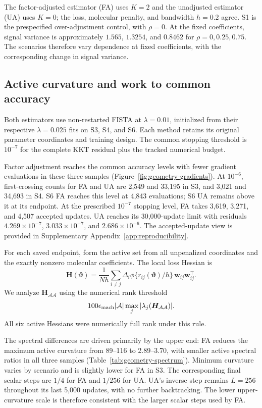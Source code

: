 

The factor-adjusted estimator (FA) uses $K=2$ and the unadjusted estimator (UA) uses $K=0$; the loss, molecular penalty, and bandwidth $h=0.2$ agree. S1 is the prespecified over-adjustment control, with $\rho=0$. At the fixed coefficients, signal variance is approximately $1.565$, $1.3254$, and $0.8462$ for $\rho=0,0.25,0.75$. The scenarios therefore vary dependence at fixed coefficients, with the corresponding change in signal variance.

\subsection{Active curvature and work to common accuracy}
\label{subsec:geometry-results}
Both estimators use non-restarted FISTA at $\lambda=0.01$, initialized from their respective $\lambda=0.025$ fits on S3, S4, and S6. Each method retains its original parameter coordinates and training design. The common stopping threshold is $10^{-7}$ for the complete KKT residual plus the tracked numerical budget.

Factor adjustment reaches the common accuracy levels with fewer gradient evaluations in these three samples (Figure~\ref{fig:geometry-gradients}). At $10^{-6}$, first-crossing counts for FA and UA are 2,549 and 33,195 in S3, and 3,021 and 34,693 in S4. S6 FA reaches this level at 4,843 evaluations; S6 UA remains above it at its endpoint. At the prescribed $10^{-7}$ stopping level, FA takes 3,619, 3,271, and 4,507 accepted updates. UA reaches its 30,000-update limit with residuals $4.269\times10^{-7}$, $3.033\times10^{-7}$, and $2.686\times10^{-6}$. The accepted-update view is provided in Supplementary Appendix~\ref{app:reproducibility}.

For each saved endpoint, form the active set from all unpenalized coordinates and the exactly nonzero molecular coefficients. The local loss Hessian is
\begin{equation}
 \bm{H}(\bm{\vartheta})=\frac1{Nh}\sum_{i\ne j}\Delta_i
   \phi\{r_{ij}(\bm{\vartheta})/h\}\,\bm{w}_{ij}\bm{w}_{ij}^\top.
 \label{eq:geometry-hessian}
\end{equation}
We analyze $\bm{H}_{\mathcal A\mathcal A}$ using the numerical rank threshold
\[100\epsilon_{\rm mach}|\mathcal A|\max_j|\lambda_j(\bm{H}_{\mathcal A\mathcal A})|.\]
All six active Hessians were numerically full rank under this rule.


The spectral differences are driven primarily by the upper end: FA reduces the maximum active curvature from 89--116 to 2.89--3.70, with smaller active spectral ratios in all three samples (Table~\ref{tab:geometry-spectrum}). Minimum curvature varies by scenario and is slightly lower for FA in S3. The corresponding final scalar steps are $1/4$ for FA and $1/256$ for UA. UA's inverse step remains $L=256$ throughout its last 5,000 updates, with no further backtracking. The lower upper-curvature scale is therefore consistent with the larger scalar steps used by FA.

